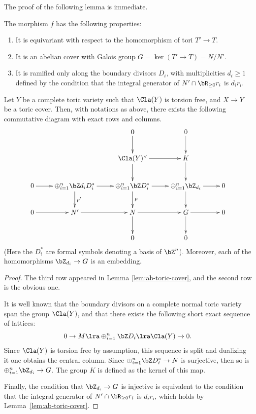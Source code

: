 \documentclass[10pt]{amsart}
\numberwithin{equation}{section}
\begin{document}
The proof of the following lemma is immediate.

\begin{lemma}\label{lem:ab-toric-cover}
  The morphism $f$ has the following properties:
  \begin{enumerate}
  \item It is equivariant with respect to the
    homomorphism of tori $T'\to T$.
  \item It is an abelian  cover with
   Galois group $G = \ker(T'\to T) = N/N'$.
  \item It is ramified only along the boundary divisors
    $D_i$, with multiplicities $d_i\ge1$ defined by the condition that
    the integral generator of $N'\cap \bR_{\ge0} r_i$ is $d_ir_i$.
      


  \end{enumerate}

\end{lemma}


\begin{proposition}\label{prop:dia-from-cover}
  Let $Y$ be a complete  toric variety such that $\Cla(Y)$ is torsion free, and $X\to
  Y$ be a toric cover. Then, with notations as above, there
  exists the following commutative diagram with exact rows and columns.
  \begin{displaymath}
    \xymatrix{
      &&0 \ar[d]
      &0 \ar[d] \\
      &&\Cla(Y)^{\vee} \ar[r]\ar[d]
      &K \ar[d] \\
      0 \ar[r] 
      &\oplus_{i=1}^n \bZ d_i D_i^* \ar[r]\ar^{p'}[d]
      &\oplus_{i=1}^n \bZ D_i^* \ar[r]\ar^p[d]
      &\oplus_{i=1}^n \bZ_{d_i}  \ar[r]\ar[d]
      &0 \\
      0 \ar[r]
      &N' \ar[r]
      &N \ar[r]\ar[d]
      &G \ar[r]\ar[d]
      &0 \\
      &&0
      &0 
      }
  \end{displaymath}
  (Here the $D_i^*$ are formal symbols denoting a basis of $\bZ^n$).
 Moreover, each of the homomorphisms
  $\bZ_{d_i} \to G$ is an embedding.
\end{proposition}
\begin{proof}
  The third row appeared in Lemma \ref{lem:ab-toric-cover}, and the second row is the
  obvious one. 

  It is well known that the boundary divisors on a complete
  normal  toric variety span the group $\Cla(Y)$,  and that there
  exists the following  short exact sequence of lattices:
  $$0 \to  M \lra \oplus_{i=1}^n \bZ D_i \lra \Cla(Y) \to 0.$$
  Since $\Cla(Y)$ is torsion free by assumption, this sequence is split and dualizing it one obtains the central column. 
  Since $\oplus_{i=1}^n\bZ D_i^* \to N$ is surjective, then so is
  $\oplus_{i=1}^n\bZ_{d_i}  \to G$. The group $K$ is defined as the 
  kernel of this map.

  Finally, the condition that $\bZ_{d_i} \to G$ is injective is
  equivalent to the condition that the integral generator of $N'\cap
  \bR_{\ge0} r_i$ is $d_ir_i$, which holds by Lemma~\ref{lem:ab-toric-cover}.
\end{proof}
\end{document}
